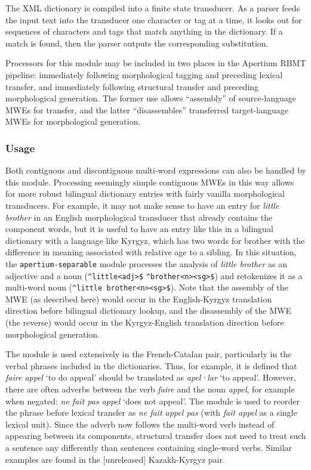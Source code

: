 \documentclass[free]{flammie}
\newcommand{\tag}[1]{\texttt{<#1>}}
\newcommand{\examp}[1]{\emph{#1}}
\newcommand{\morphform}[1]{\texttt{#1}}
\begin{document}
The XML dictionary is compiled into a finite state transducer. As a parser feeds
the input text into the transducer one character or tag at a time, it looks out
for sequences of characters and tags that match anything in the dictionary. If a
match is found, then the parser outputs the corresponding substitution.


Processors for this module may be included in two places in the Apertium RBMT
pipeline: immediately following morphological tagging and preceding lexical
transfer, and immediately following structural transfer and preceding
morphological generation.  The former use allows ``assembly'' of source-language
MWEs for transfer, and the latter ``disassembles'' transferred target-language
MWEs for morphological generation.

\subsubsection{Usage}\label{sec:separable-usage}
Both contiguous and discontiguous multi-word expressions can also be handled by
this module.  Processing seemingly simple contiguous MWEs in this way allows for
more robust bilingual dictionary entries with fairly vanilla morphological
transducers. For example, it may not make sense to have an entry for
\examp{little brother} in an English morphological transducer that already
contains the component words, but it is useful to have an entry like this in a
bilingual dictionary with a language like Kyrgyz, which has two words for
brother with the difference in meaning associated with relative age to a
sibling.  In this situation, the \texttt{apertium-separable} module processes
the analysis of \examp{little brother} as an adjective and a noun
(\morphform{\^{}little\tag{adj}\$} \morphform{\^{}brother\tag{n}\tag{sg}\$}) and
retokenizes it as a multi-word noun (\morphform{\^{}little
brother\tag{n}\tag{sg}\$}). Note that the assembly of the MWE (as described
here) would occur in the English-Kyrgyz translation direction before bilingual
dictionary lookup, and the disassembly of the MWE (the reverse) would occur in
the Kyrgyz-English translation direction before morphological generation.

The module is used extensively in the French-Catalan pair, particularly in the
verbal phrases included in the dictionaries. Thus, for example, it is defined
that \examp{faire appel} `to do appeal' should be translated as \examp{apel·lar}
`to appeal'.  However, there are often adverbs between the verb \emph{faire} and
the noun \examp{appel}, for example when negated: \examp{ne fait pas appel}
`does not appeal'. The module is used to reorder the phrase before lexical
transfer as \emph{ne fait appel pas} (with \emph{fait appel} as a single lexical
unit).  Since the adverb now follows the multi-word verb instead of appearing
between its components, structural transfer does not need to treat such a
sentence any differently than sentences containing single-word verbs.  Similar
examples are found in the [unreleased] Kazakh-Kyrgyz pair.
\end{document}
